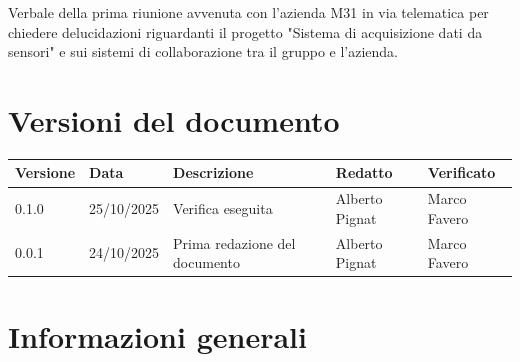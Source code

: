 \documentclass[a4paper,12pt]{article}
\begin{document}
\vspace{0.5cm}

\begin{center}
\begin{tcolorbox}[colback=secondaryblue!10,colframe=secondaryblue,width=0.9\textwidth,arc=3mm,boxrule=0.8pt,title={\bfseries Abstract}]
Verbale della prima riunione avvenuta con l'azienda M31 in via telematica per chiedere delucidazioni riguardanti il progetto "Sistema di acquisizione dati da sensori" e sui sistemi di collaborazione tra il gruppo e l'azienda.
\end{tcolorbox}
\end{center}

\newpage 

\section*{Versioni del documento}
{\footnotesize
\begin{tabularx}{\textwidth}{|p{1.5cm}|p{2cm}|X|p{2cm}|p{2cm}|}
\hline
\textbf{Versione} & \textbf{Data} & \textbf{Descrizione} & \textbf{Redatto} & \textbf{Verificato} \\
\hline
0.1.0 & 25/10/2025 & Verifica eseguita & Alberto Pignat & Marco Favero \\
\hline
0.0.1 & 24/10/2025 & Prima redazione del documento & Alberto Pignat & Marco Favero \\
\hline
\end{tabularx}
}


\newpage

\tableofcontents
\newpage


\section{Informazioni generali}
\end{document}
